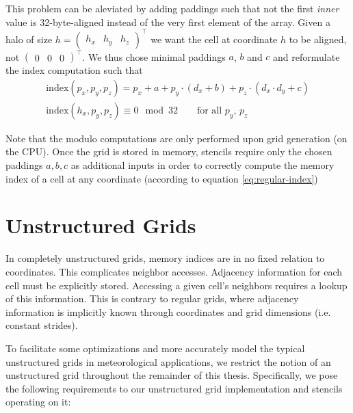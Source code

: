 This problem can be aleviated by adding paddings such that not the first \emph{inner} value is 32-byte-aligned instead of the very first element of the array. Given a halo of size $h = \begin{pmatrix}h_x & h_y & h_z\end{pmatrix}^\top$ we want the cell at coordinate $h$ to be aligned, not $\begin{pmatrix} 0 & 0 & 0\end{pmatrix}^\top$. We thus chose minimal paddings $a$, $b$ and $c$ and reformulate the index computation such that
\begin{gather}
    \text{index}\left(p_x, p_y, p_z\right) = p_x + a + p_y \cdot \left(d_x + b\right) + p_z \cdot \left(d_x \cdot d_y + c\right) \label{eq:regular-index}
    \\
    \text{index}\left(h_x, p_y, p_z\right) \equiv 0 \mod 32 \qquad \text{for all $p_y$, $p_z$}
\end{gather}

Note that the modulo computations are only performed upon grid generation (on the CPU). Once the grid is stored in memory, stencils require only the chosen paddings $a, b, c$ as additional inputs in order to correctly compute the memory index of a cell at any coordinate (according to equation \ref{eq:regular-index})

\section{Unstructured Grids}

In completely unstructured grids, 
memory indices are in no fixed relation to coordinates. This complicates neighbor accesses. Adjacency information for each cell must be explicitly stored. Accessing a given cell's neighbors requires a lookup of this information. This is contrary to regular grids, where adjacency information is implicitly known through coordinates and grid dimensions (i.e. constant strides).

To facilitate some optimizations and more accurately model the typical unstructured grids in meteorological applications, we restrict the notion of an unstructured grid throughout the remainder of this thesis. Specifically, we pose the following requirements to our unstructured grid implementation and stencils operating on it:

